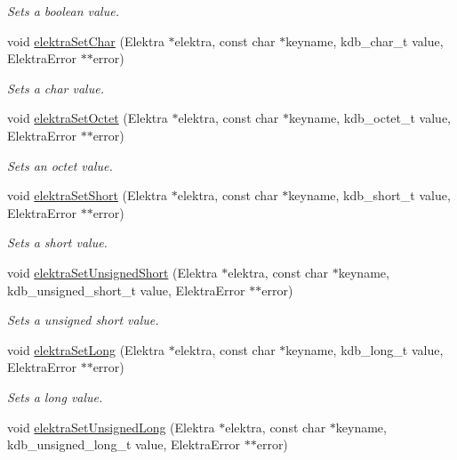 \begin{DoxyCompactItemize}
\begin{DoxyCompactList}\small\item\em Sets a boolean value. \end{DoxyCompactList}\item 
void \hyperlink{group__highlevel_ga5e00b3685b0ec462a4f377481b786787}{elektra\+Set\+Char} (Elektra $\ast$elektra, const char $\ast$keyname, kdb\+\_\+char\+\_\+t value, Elektra\+Error $\ast$$\ast$error)
\begin{DoxyCompactList}\small\item\em Sets a char value. \end{DoxyCompactList}\item 
void \hyperlink{group__highlevel_ga8ad9e3df6cf7868a38604d29122f4e21}{elektra\+Set\+Octet} (Elektra $\ast$elektra, const char $\ast$keyname, kdb\+\_\+octet\+\_\+t value, Elektra\+Error $\ast$$\ast$error)
\begin{DoxyCompactList}\small\item\em Sets an octet value. \end{DoxyCompactList}\item 
void \hyperlink{group__highlevel_ga067b1785a444fd98349e0e2b9f43ce3e}{elektra\+Set\+Short} (Elektra $\ast$elektra, const char $\ast$keyname, kdb\+\_\+short\+\_\+t value, Elektra\+Error $\ast$$\ast$error)
\begin{DoxyCompactList}\small\item\em Sets a short value. \end{DoxyCompactList}\item 
void \hyperlink{group__highlevel_gaf2e211a564bd082715e3256ceaf5e1c3}{elektra\+Set\+Unsigned\+Short} (Elektra $\ast$elektra, const char $\ast$keyname, kdb\+\_\+unsigned\+\_\+short\+\_\+t value, Elektra\+Error $\ast$$\ast$error)
\begin{DoxyCompactList}\small\item\em Sets a unsigned short value. \end{DoxyCompactList}\item 
void \hyperlink{group__highlevel_gaf2564ca6e0e4440359074a0b59a02344}{elektra\+Set\+Long} (Elektra $\ast$elektra, const char $\ast$keyname, kdb\+\_\+long\+\_\+t value, Elektra\+Error $\ast$$\ast$error)
\begin{DoxyCompactList}\small\item\em Sets a long value. \end{DoxyCompactList}\item 
void \hyperlink{group__highlevel_ga7f0fef70748854e222db829050079136}{elektra\+Set\+Unsigned\+Long} (Elektra $\ast$elektra, const char $\ast$keyname, kdb\+\_\+unsigned\+\_\+long\+\_\+t value, Elektra\+Error $\ast$$\ast$error)

\end{DoxyCompactItemize}
